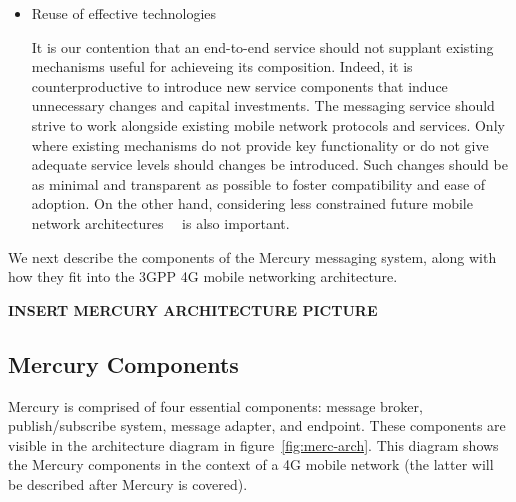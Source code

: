 \begin{itemize}
\item Reuse of effective technologies

It is our contention that an end-to-end service should not supplant
existing mechanisms useful for achieveing its composition.  Indeed, it
is counterproductive to introduce new service components that induce
unnecessary changes and capital investments. The messaging service
should strive to work alongside existing mobile network protocols and
services.  Only where existing mechanisms do not provide key
functionality or do not give adequate service levels should changes be
introduced.  Such changes should be as minimal and transparent as
possible to foster compatibility and ease of adoption. On the other
hand, considering less constrained future mobile network
architectures~\cite{5G}~\cite{MobilityFirst} is also important.

\end{itemize}

We next describe the components of the Mercury messaging system, along
with how they fit into the 3GPP 4G mobile networking architecture.

{\bf INSERT MERCURY ARCHITECTURE PICTURE}

\subsection{Mercury Components}

Mercury is comprised of four essential components: message broker,
publish/subscribe system, message adapter, and endpoint.  These
components are visible in the architecture diagram in
figure~\ref{fig:merc-arch}. This diagram shows the Mercury components
in the context of a 4G mobile network (the latter will be described
after Mercury is covered).

